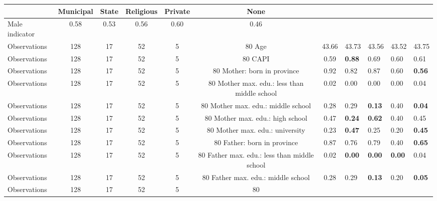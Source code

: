 \begin{tabular}{l c c c c c c }
\toprule
& \textbf{Municipal} & \textbf{State} & \textbf{Religious} & \textbf{Private} & \textbf{None} \\
\midrule
Male indicator &      0.58 &      0.53 &      0.56 &      0.60 &      0.46 \\
\midrule
Observations &       128 &        17 &        52 &         5 &        80
Age &     43.66 &     43.73 &     43.56 &     43.52 &     43.75 \\
\midrule
Observations &       128 &        17 &        52 &         5 &        80
CAPI &      0.59 & \textbf{     0.88} &      0.69 &      0.60 &      0.61 \\
\midrule
Observations &       128 &        17 &        52 &         5 &        80
Mother: born in province &      0.92 &      0.82 &      0.87 &      0.60 & \textbf{     0.56} \\
\midrule
Observations &       128 &        17 &        52 &         5 &        80
Mother max. edu.: less than middle school &      0.02 &      0.00 &      0.00 &      0.00 &      0.04 \\
\midrule
Observations &       128 &        17 &        52 &         5 &        80
Mother max. edu.: middle school &      0.28 &      0.29 & \textbf{     0.13} &      0.40 & \textbf{     0.04} \\
\midrule
Observations &       128 &        17 &        52 &         5 &        80
Mother max. edu.: high school &      0.47 & \textbf{     0.24} & \textbf{     0.62} &      0.40 &      0.45 \\
\midrule
Observations &       128 &        17 &        52 &         5 &        80
Mother max. edu.: university &      0.23 & \textbf{     0.47} &      0.25 &      0.20 & \textbf{     0.45} \\
\midrule
Observations &       128 &        17 &        52 &         5 &        80
Father: born in province &      0.87 &      0.76 &      0.79 &      0.40 & \textbf{     0.65} \\
\midrule
Observations &       128 &        17 &        52 &         5 &        80
Father max. edu.: less than middle school &      0.02 & \textbf{     0.00} & \textbf{     0.00} & \textbf{     0.00} &      0.04 \\
\midrule
Observations &       128 &        17 &        52 &         5 &        80
Father max. edu.: middle school &      0.28 &      0.29 & \textbf{     0.13} &      0.20 & \textbf{     0.05} \\
\midrule
Observations &       128 &        17 &        52 &         5 &        80

\end{tabular}
